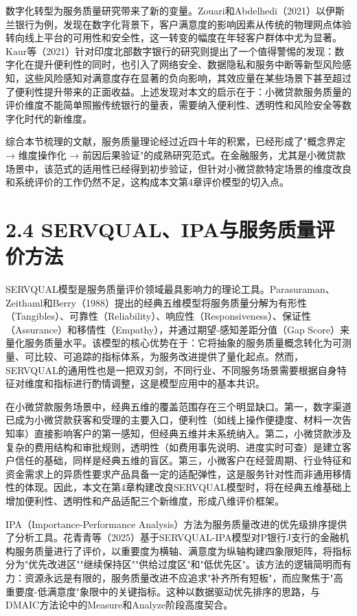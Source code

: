 数字化转型为服务质量研究带来了新的变量。Zouari和Abdelhedi（2021）以伊斯兰银行为例，发现在数字化背景下，客户满意度的影响因素从传统的物理网点体验转向线上平台的可用性和安全性，这一转变的幅度在年轻客户群体中尤为显著\cite{ref39}。Kaur等（2021）针对印度北部数字银行的研究则提出了一个值得警惕的发现：数字化在提升便利性的同时，也引入了网络安全、数据隐私和服务中断等新型风险感知，这些风险感知对满意度存在显著的负向影响，其效应量在某些场景下甚至超过了便利性提升带来的正面收益\cite{ref40}。上述发现对本文的启示在于：小微贷款服务质量的评价维度不能简单照搬传统银行的量表，需要纳入便利性、透明性和风险安全等数字化时代的新维度。\par

综合本节梳理的文献，服务质量理论经过近四十年的积累，已经形成了"概念界定 → 维度操作化 → 前因后果验证"的成熟研究范式。在金融服务，尤其是小微贷款场景中，该范式的适用性已经得到初步验证，但针对小微贷款特定场景的维度改良和系统评价的工作仍然不足，这构成本文第4章评价模型的切入点。\par

\section{2.4 SERVQUAL、IPA与服务质量评价方法}

SERVQUAL模型是服务质量评价领域最具影响力的理论工具。Parasuraman、Zeithaml和Berry（1988）提出的经典五维模型将服务质量分解为有形性（Tangibles）、可靠性（Reliability）、响应性（Responsiveness）、保证性（Assurance）和移情性（Empathy），并通过期望-感知差距分值（Gap Score）来量化服务质量水平\cite{ref14}。该模型的核心优势在于：它将抽象的服务质量概念转化为可测量、可比较、可追踪的指标体系，为服务改进提供了量化起点。然而，SERVQUAL的通用性也是一把双刃剑，不同行业、不同服务场景需要根据自身特征对维度和指标进行酌情调整，这是模型应用中的基本共识。\par

在小微贷款服务场景中，经典五维的覆盖范围存在三个明显缺口。第一，数字渠道已成为小微贷款获客和受理的主要入口，便利性（如线上操作便捷度、材料一次告知率）直接影响客户的第一感知，但经典五维并未系统纳入。第二，小微贷款涉及复杂的费用结构和审批规则，透明性（如费用事先说明、进度实时可查）是建立客户信任的基础，同样是经典五维的盲区。第三，小微客户在经营周期、行业特征和资金需求上的异质性要求产品具备一定的适配弹性，这是服务针对性而非通用移情性的体现。因此，本文在第4章构建改良SERVQUAL模型时，将在经典五维基础上增加便利性、透明性和产品适配三个新维度，形成八维评价框架。\par

IPA（Importance-Performance Analysis）方法为服务质量改进的优先级排序提供了分析工具。花青青等（2025）基于SERVQUAL-IPA模型对P银行J支行的金融机构服务质量进行了评价，以重要度为横轴、满意度为纵轴构建四象限矩阵，将指标分为"优先改进区""继续保持区""供给过度区"和"低优先区"\cite{ref15}。该方法的逻辑简明而有力：资源永远是有限的，服务质量改进不应追求"补齐所有短板"，而应聚焦于"高重要度-低满意度"象限中的关键指标。这种以数据驱动优先排序的思路，与DMAIC方法论中的Measure和Analyze阶段高度契合。\par

